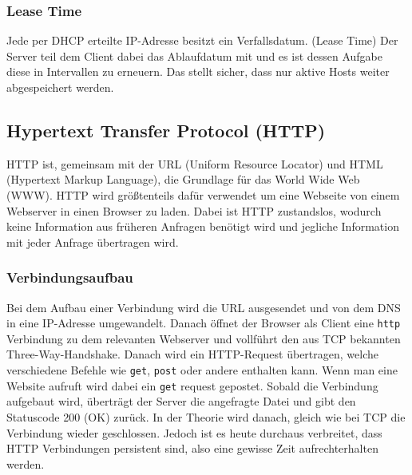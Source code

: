 \documentclass{article}
\begin{document}
	 \subsubsection{Lease Time}
	 Jede per DHCP erteilte IP-Adresse besitzt ein Verfallsdatum. (Lease Time) Der Server teil dem Client dabei das Ablaufdatum mit und es ist dessen Aufgabe diese in Intervallen zu erneuern. Das stellt sicher, dass nur aktive Hosts weiter abgespeichert werden.
	 \subsection{Hypertext Transfer Protocol (HTTP)}
	 HTTP ist, gemeinsam mit der URL (Uniform Resource Locator) und HTML (Hypertext Markup Language), die Grundlage für das World Wide Web (WWW). HTTP wird größtenteils dafür verwendet um eine Webseite von einem Webserver in einen Browser zu laden. Dabei ist HTTP zustandslos, wodurch keine Information aus früheren Anfragen benötigt wird und jegliche Information mit jeder Anfrage übertragen wird.
	 \subsubsection{Verbindungsaufbau}
	 Bei dem Aufbau einer Verbindung wird die URL ausgesendet und von dem DNS in eine IP-Adresse umgewandelt. Danach öffnet der Browser als Client eine \verb|http| Verbindung zu dem relevanten Webserver und vollführt den aus TCP bekannten Three-Way-Handshake. Danach wird ein HTTP-Request übertragen, welche verschiedene Befehle wie \verb|get|, \verb|post| oder andere enthalten kann. Wenn man eine Website aufruft wird dabei ein \verb|get| request gepostet. Sobald die Verbindung aufgebaut wird, überträgt der Server die angefragte Datei und gibt den Statuscode 200 (OK) zurück. In der Theorie wird danach, gleich wie bei TCP die Verbindung wieder geschlossen. Jedoch ist es heute durchaus verbreitet, dass HTTP Verbindungen persistent sind, also eine gewisse Zeit aufrechterhalten werden.
\end{document}
